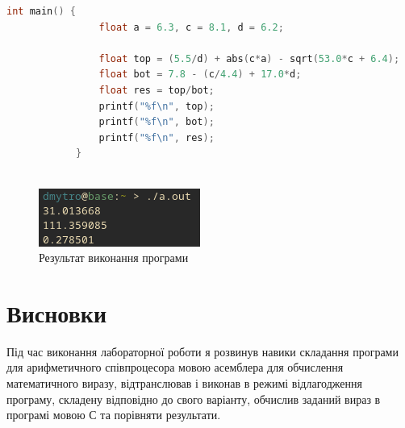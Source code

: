 \documentclass{article}
\begin{document}
\begin{normalsize}
\begin{lstlisting}[language={C}]
			int main() {
				float a = 6.3, c = 8.1, d = 6.2;
				
				float top = (5.5/d) + abs(c*a) - sqrt(53.0*c + 6.4);
				float bot = 7.8 - (c/4.4) + 17.0*d;
				float res = top/bot;
				printf("%f\n", top);
				printf("%f\n", bot);
				printf("%f\n", res);
			}
			
		\end{lstlisting}
		
		\begin{figure}[H]
			\centering
			\includegraphics[scale=1]{2}
			\caption{Результат виконання програми}
		\end{figure}
		
		\section*{Висновки}
		Під час виконання лабораторної роботи я розвинув навики складання програми для арифметичного співпроцесора мовою асемблера для обчислення математичного виразу, відтранслював і виконав в режимі відлагодження програму, складену відповідно до свого варіанту, обчислив заданий вираз в програмі мовою С та порівняти результати.
		
	\end{normalsize}
\end{document}
